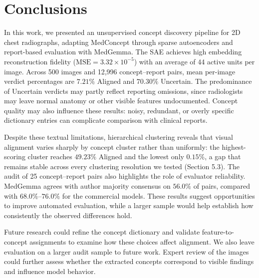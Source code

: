 \section{Conclusions}
In this work, we presented an unsupervised concept discovery pipeline for 2D chest radiographs, adapting MedConcept through sparse autoencoders and report-based evaluation with MedGemma. The SAE achieves high embedding reconstruction fidelity ($\text{MSE} = 3.32 \times 10^{-5}$) with an average of 44 active units per image. Across 500 images and 12,996 concept--report pairs, mean per-image verdict percentages are $7.21\%$ Aligned and $70.30\%$ Uncertain. The predominance of Uncertain verdicts may partly reflect reporting omissions, since radiologists may leave normal anatomy or other visible features undocumented. Concept quality may also influence these results: noisy, redundant, or overly specific dictionary entries can complicate comparison with clinical reports.


Despite these textual limitations, hierarchical clustering reveals that visual alignment varies sharply by concept cluster rather than uniformly: the highest-scoring cluster reaches $49.23\%$ Aligned and the lowest only $0.15\%$, a gap that remains stable across every clustering resolution we tested (Section 5.3). The audit of 25 concept--report pairs also highlights the role of evaluator reliability. MedGemma agrees with author majority consensus on $56.0\%$ of pairs, compared with $68.0\%$--$76.0\%$ for the commercial models. These results suggest opportunities to improve automated evaluation, while a larger sample would help establish how consistently the observed differences hold.

Future research could refine the concept dictionary and validate feature-to-concept assignments to examine how these choices affect alignment. We also leave evaluation on a larger audit sample to future work. Expert review of the images could further assess whether the extracted concepts correspond to visible findings and influence model behavior.